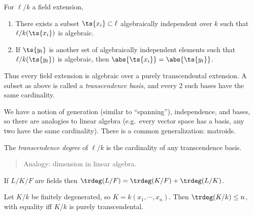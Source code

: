 \begin{theorem}[?]

For \(\ell/k\) a field extension,

\begin{enumerate}
\def\labelenumi{\alph{enumi}.}
\item
  There exists a subset \(\ts{x_i}\subset \ell\) algebraically
  independent over \(k\) such that \(\ell/k(\ts{x_i})\) is algebraic.
\item
  If \(\ts{y_t}\) is another set of algebraically independent elements
  such that \(\ell/k(\ts{y_t})\) is algebraic, then
  \(\abs{\ts{x_i}} = \abs{\ts{y_t}}\).
\end{enumerate}

\end{theorem}

Thus every field extension is algebraic over a purely transcendental
extension. A subset as above is called a \emph{transcendence basis}, and
every 2 such bases have the same cardinality.

We have a notion of generation (similar to ``spanning''), independence,
and bases, so there are analogies to linear algebra (e.g.~every vector
space has a basis, any two have the same cardinality). There is a common
generalization: matroids.

\begin{definition}

The \emph{transcendence degree} of \(\ell/k\) is the cardinality of any
transcendence basis.

\begin{quote}
Analogy: dimension in linear algebra.
\end{quote}

\end{definition}

\begin{theorem}

If \(L/K/F\) are fields then
\(\trdeg(L/F) = \trdeg(K/F) + \trdeg(L/K)\).

\end{theorem}

\begin{theorem}

Let \(K/k\) be finitely degenerated, so \(K = k(x_1, \cdots, x_n)\).
Then \(\trdeg(K/k) \leq n\), with equality iff \(K/k\) is purely
transcendental.

\end{theorem}

